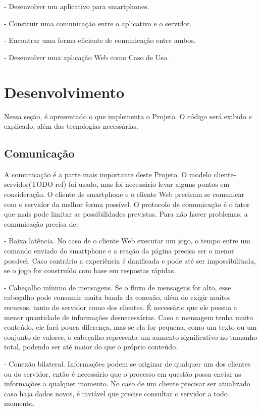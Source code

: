 \documentclass[a4paper,12pt]{article}
\begin{document}
- Desenvolver um aplicativo para smartphones.

- Construir uma comunicação entre o aplicativo e o servidor.

- Encontrar uma forma eficiente de comunicação entre ambos.

- Desenvolver uma aplicação Web como Caso de Uso.



\newpage
\section{Desenvolvimento}

Nessa seção, é apresentado o que implementa o Projeto. O código será exibido e explicado, além das tecnologias necessárias.


\subsection{Comunicação}

A comunicação é a parte mais importante deste Projeto. O modelo cliente-servidor(TODO ref) foi usado, mas foi necessário levar alguns pontos em consideração. O cliente de smartphone e o cliente Web precisam se comunicar com o servidor da melhor forma possível. O protocolo de comunicação é o fator que mais pode limitar as possibilidades previstas. Para não haver problemas, a comunicação precisa de:

- Baixa latência. No caso de o cliente Web executar um jogo, o tempo entre um comando enviado do smartphone e a reação da página precisa ser o menor possível. Caso contrário a experiência é danificada e pode até ser impossibilitada, se o jogo for construído com base em respostas rápidas.

- Cabeçalho mínimo de mensagens. Se o fluxo de mensagens for alto, esse cabeçalho pode consumir muita banda da conexão, além de exigir muitos recursos, tanto do servidor como dos clientes. É necessário que ele possua a menor quantidade de informações desnecessárias. Caso a mensagem tenha muito conteúdo, ele fará pouca diferença, mas se ela for pequena, como um texto ou um conjunto de valores, o cabeçalho representa um aumento significativo no tamanho total, podendo ser até maior do que o próprio conteúdo.

- Conexão bilateral. Informações podem se originar de qualquer um dos clientes ou do servidor, então é necessário que o processo em questão possa enviar as informações a qualquer momento. No caso de um cliente precisar ser atualizado caso haja dados novos, é inviável que precise consultar o servidor a todo momento.
\end{document}
